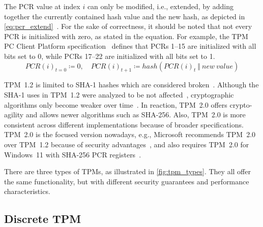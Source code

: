 The PCR value at index \(i\) can only be modified, i.e., extended, by adding together the currently contained hash value and the new hash, as depicted in \autoref{eq:pcr_extend}~\cite{tpm}.
For the sake of correctness, it should be noted that not every PCR is initialized with zero, as stated in the equation.
For example, the TPM PC Client Platform specification~\cite{tcgPcClient} defines that PCRs 1--15 are initialized with all bits set to 0, while PCRs 17--22 are initialized with all bits set to 1.
\begin{equation}
  \label{eq:pcr_extend}
PCR(i)_{t=0} \coloneqq 0,\quad PCR(i)_{t+1} \coloneqq hash(PCR(i)_t\ \Vert\ new\ value)
\end{equation}

%


TPM~1.2 is limited to SHA-1 hashes which are considered broken~\cite{cryptoeprint:2005/010, Wang2005, Stevens2017}.
Although the SHA-1 uses in TPM~1.2 were analyzed to be not affected~\cite{sha1tpm12}, cryptographic algorithms only become weaker over time~\cite{Arthur2015}.
In reaction, TPM~2.0 offers crypto-agility and allows newer algorithms such as SHA-256.
Also, TPM~2.0 is more consistent across different implementations because of broader specifications.
TPM~2.0 is the focused version nowadays, e.g., Microsoft recommends TPM~2.0 over TPM~1.2 because of security advantages~\cite{micrec}, and also requires TPM~2.0 for Windows~11 with SHA-256 PCR registers~\cite{win11req}.




There are three types of TPMs, as illustrated in \autoref{fig:tpm_types}. They all offer the same functionality, but with different security guarantees and performance characteristics.



\subsection{Discrete TPM}

